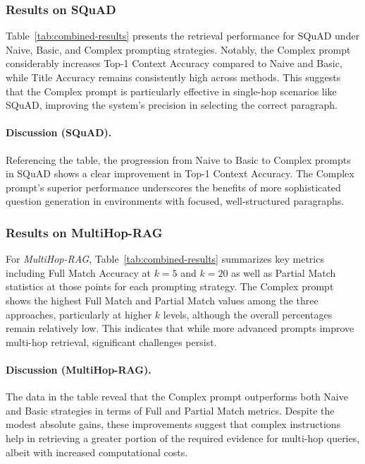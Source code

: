 \vspace{1em}
\subsubsection{Results on SQuAD}
\label{subsubsec:prompt-squad}
Table~\ref{tab:combined-results} presents the retrieval performance for SQuAD under Naive, Basic, and Complex prompting strategies. Notably, the Complex prompt considerably increases Top-1 Context Accuracy compared to Naive and Basic, while Title Accuracy remains consistently high across methods. This suggests that the Complex prompt is particularly effective in single-hop scenarios like SQuAD, improving the system’s precision in selecting the correct paragraph.

\paragraph{Discussion (SQuAD).}
Referencing the table, the progression from Naive to Basic to Complex prompts in SQuAD shows a clear improvement in Top-1 Context Accuracy. The Complex prompt's superior performance underscores the benefits of more sophisticated question generation in environments with focused, well-structured paragraphs.

\vspace{1em}
\subsubsection{Results on MultiHop-RAG}
\label{subsubsec:prompt-multihop-updated}
For \emph{MultiHop-RAG}, Table~\ref{tab:combined-results} summarizes key metrics including Full Match Accuracy at \(k=5\) and \(k=20\) as well as Partial Match statistics at those points for each prompting strategy. The Complex prompt shows the highest Full Match and Partial Match values among the three approaches, particularly at higher \(k\) levels, although the overall percentages remain relatively low. This indicates that while more advanced prompts improve multi-hop retrieval, significant challenges persist.

\paragraph{Discussion (MultiHop-RAG).}
The data in the table reveal that the Complex prompt outperforms both Naive and Basic strategies in terms of Full and Partial Match metrics. Despite the modest absolute gains, these improvements suggest that complex instructions help in retrieving a greater portion of the required evidence for multi-hop queries, albeit with increased computational costs.


